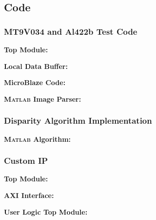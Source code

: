\subsection{Code}

\subsubsection{MT9V034 and Al422b Test Code} \label{mt9v034TestCode}
\textbf{Top Module:}
\singlespacing

\doublespacing
\par
\textbf{Local Data Buffer:}
\singlespacing

\doublespacing
\par
\textbf{MicroBlaze Code:}
\label{camTestC}
\singlespacing

\doublespacing
\par
\textbf{\textsc{Matlab} Image Parser:}
\label{camTestMatlab}
\singlespacing

\doublespacing

\newpage

\subsubsection{Disparity Algorithm Implementation} \label{disparityTestMatlab}
\textbf{\textsc{Matlab} Algorithm:}
\singlespacing

\doublespacing

\newpage

\subsubsection{Custom IP} 
\textbf{Top Module:} \label{customIPtop}
\singlespacing

\doublespacing

\par
\textbf{AXI Interface:} \label{customIPaxi}
\singlespacing

\doublespacing

\par
\textbf{User Logic Top Module:}
\singlespacing

\doublespacing

